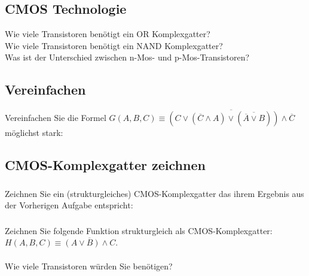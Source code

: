 \subsection{CMOS Technologie}
Wie viele Transistoren benötigt ein OR Komplexgatter?\\[0.3cm]
Wie viele Transistoren benötigt ein NAND Komplexgatter?\\[0.3cm]
Was ist der Unterschied zwischen n-Mos- und p-Mos-Transistoren?\\[0.3cm]
\noindent
\subsection{Vereinfachen}
Vereinfachen Sie die Formel $G(A,B,C)\equiv \overline{\left(C \lor (\overline{C} \land A) \lor (\overline{\overline{A} \lor B})\right) \land \overline{C} } $ möglichst stark: \\
\noindent
\subsection{CMOS-Komplexgatter zeichnen}
\subsubsection{}
Zeichnen Sie ein (strukturgleiches) CMOS-Komplexgatter das ihrem Ergebnis aus der Vorherigen Aufgabe entspricht:\\[0.3cm]
\subsubsection{}
Zeichnen Sie folgende Funktion strukturgleich als CMOS-Komplexgatter: $H(A,B,C)\equiv \overline{(A \lor B) \land C}$.\\
\\[0.3cm]
Wie viele Transistoren würden Sie benötigen? 
